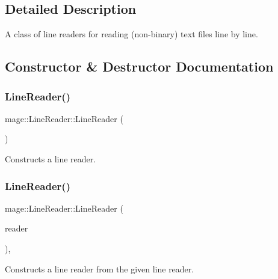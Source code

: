 \subsection{Detailed Description}
A class of line readers for reading (non-\/binary) text files line by line. 

\subsection{Constructor \& Destructor Documentation}
\mbox{\label{classmage_1_1_line_reader_ab4a46321d7ea3ecda2d6390c78a7285b}} 
\subsubsection{\texorpdfstring{Line\+Reader()}{LineReader()}\hspace{0.1cm}{\footnotesize\ttfamily [1/3]}}
{\footnotesize\ttfamily mage\+::\+Line\+Reader\+::\+Line\+Reader (\begin{DoxyParamCaption}{ }\end{DoxyParamCaption})\hspace{0.3cm}{\ttfamily [protected]}}

Constructs a line reader. \mbox{\label{classmage_1_1_line_reader_ae4f871bebae110704b34c0bd88460639}} 
\subsubsection{\texorpdfstring{Line\+Reader()}{LineReader()}\hspace{0.1cm}{\footnotesize\ttfamily [2/3]}}
{\footnotesize\ttfamily mage\+::\+Line\+Reader\+::\+Line\+Reader (\begin{DoxyParamCaption}\item[{const \mbox{\hyperlink{classmage_1_1_line_reader}{Line\+Reader}} \&}]{reader }\end{DoxyParamCaption})\hspace{0.3cm}{\ttfamily [protected]}, {\ttfamily [delete]}}

Constructs a line reader from the given line reader.


